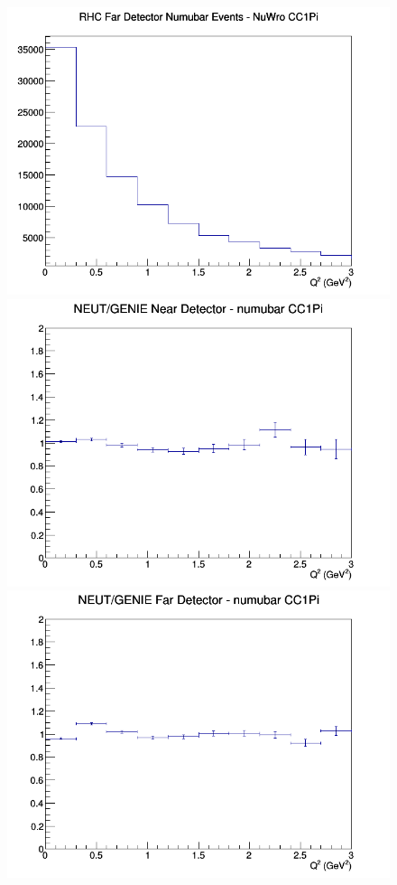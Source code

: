 \begin{figure}[h]
\endminipage
{}
\includegraphics[width=\linewidth]{eff_Q2/FGT/CC1Pi_RHC_FD_numubar_Q2_NuWro.png}
\endminipage
\newline
{}
\includegraphics[width=\linewidth]{eff_Q2/FGT/ratios/CC1Pi_NEUT_GENIE_numubar_near_Q2.png}
\endminipage
{}
\includegraphics[width=\linewidth]{eff_Q2/FGT/ratios/CC1Pi_NEUT_GENIE_numubar_far_Q2.png}

\end{figure}
